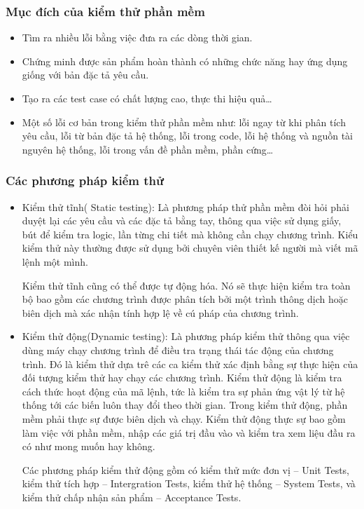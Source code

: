 	\subsubsection{Mục đích của kiểm thử phần mềm}
	\begin{itemize}
		\item Tìm ra nhiều lỗi bằng việc đưa ra các dòng thời gian.
		\item Chứng minh được sản phẩm hoàn thành có những chức năng hay ứng dụng giống với bản đặc tả yêu cầu.
		\item Tạo ra các test case có chất lượng cao, thực thi hiệu quả…
		\item Một số lỗi cơ bản trong kiểm thử phần mềm như: lỗi ngay từ khi phân tích yêu cầu, lỗi từ bản đặc tả hệ thống, lỗi trong code, lỗi hệ thống và nguồn tài nguyên hệ thống, lỗi trong vấn đề phần mềm, phần cứng…		
	\end{itemize}

	\subsubsection{Các phương pháp kiểm thử}
	\begin{itemize}
		\item Kiểm thử tĩnh( Static testing): Là phương pháp thử phần mềm đòi hỏi phải duyệt lại các yêu cầu và các đặc tả bằng tay, thông qua việc sử dụng giấy, bút để kiểm tra logic, lần từng chi tiết mà không cần chạy chương trình. Kiểu kiểm thử này thường được sử dụng bởi chuyên viên thiết kế người mà viết mã lệnh một mình.
		
		Kiểm thử tĩnh cũng có thể được tự động hóa. Nó sẽ thực hiện kiểm tra toàn bộ bao gồm các chương trình được phân tích bởi một trình thông dịch hoặc biên dịch mà xác nhận tính hợp lệ về cú pháp của chương trình.
		
		\item Kiểm thử động(Dynamic testing): Là phương pháp kiểm thử thông qua việc dùng máy chạy chương trình để điều tra trạng thái tác động của chương trình. Đó là kiểm thử dựa trê các ca kiểm thử xác định bằng sự thực hiện của đối tượng kiểm thử hay chạy các chương trình. Kiểm thử động là kiểm tra cách thức hoạt động của mã lệnh, tức là kiểm tra sự phản ứng vật lý từ hệ thống tới các biến luôn thay đổi theo thời gian. Trong kiểm thử động, phần mềm phải thực sự được biên dịch và chạy. Kiểm thử động thực sự bao gồm làm việc với phần mềm, nhập các giá trị đầu vào và kiểm tra xem liệu đầu ra có như mong muốn hay không.
		
		Các phương pháp kiểm thử động gồm có kiểm thử mức đơn vị – Unit Tests, kiểm thử tích hợp – Intergration Tests, kiểm thử hệ thống – System Tests, và kiểm thử chấp nhận sản phẩm – Acceptance Tests.		
	\end{itemize}


